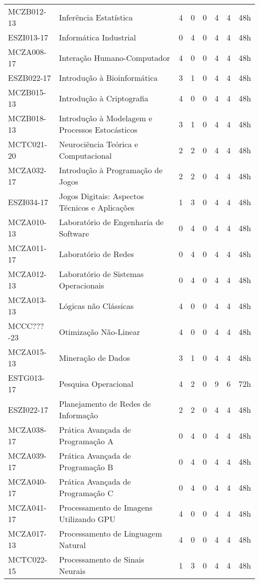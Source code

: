 \documentclass[a4paper]{article}
\begin{document}
\begin{longtable}{|l|l|llll|l|l|}
MCZB012-13 & Inferência Estatística & 4 & 0 & 0 & 4 & 4 & 48h \\
ESZI013-17 & Informática Industrial & 0 & 4 & 0 & 4 & 4 & 48h \\
MCZA008-17 & Interação Humano-Computador & 4 & 0 & 0 & 4 & 4 & 48h \\
ESZB022-17 & Introdução à Bioinformática & 3 & 1 & 0 & 4 & 4 & 48h \\
MCZB015-13 & Introdução à Criptografia & 4 & 0 & 0 & 4 & 4 & 48h \\
MCZB018-13 & Introdução à Modelagem e Processos Estocásticos & 3 & 1 & 0 & 4 & 4 & 48h \\
MCTC021-20 & Neurociência Teórica e Computacional & 2 & 2 & 0 & 4 & 4 & 48h \\
MCZA032-17 & Introdução à Programação de Jogos & 2 & 2 & 0 & 4 & 4 & 48h \\
ESZI034-17 & Jogos Digitais: Aspectos Técnicos e Aplicações & 1 & 3 & 0 & 4 & 4 & 48h \\
MCZA010-13 & Laboratório de Engenharia de Software & 0 & 4 & 0 & 4 & 4 & 48h \\
MCZA011-17 & Laboratório de Redes & 0 & 4 & 0 & 4 & 4 & 48h \\
MCZA012-13 & Laboratório de Sistemas Operacionais & 0 & 4 & 0 & 4 & 4 & 48h \\
MCZA013-13 & Lógicas não Clássicas & 4 & 0 & 0 & 4 & 4 & 48h \\
MCCC???-23 & Otimização Não-Linear & 4 & 0 & 0 & 4 & 4 & 48h \\
MCZA015-13 & Mineração de Dados & 3 & 1 & 0 & 4 & 4 & 48h \\
ESTG013-17 & Pesquisa Operacional & 4 & 2 & 0 & 9 & 6 & 72h \\
ESZI022-17 & Planejamento de Redes de Informação & 2 & 2 & 0 & 4 & 4 & 48h \\
MCZA038-17 & Prática Avançada de Programação A & 0 & 4 & 0 & 4 & 4 & 48h \\
MCZA039-17 & Prática Avançada de Programação B & 0 & 4 & 0 & 4 & 4 & 48h \\
MCZA040-17 & Prática Avançada de Programação C & 0 & 4 & 0 & 4 & 4 & 48h \\
MCZA041-17 & Processamento de Imagens Utilizando GPU & 4 & 0 & 0 & 4 & 4 & 48h \\
MCZA017-13 & Processamento de Linguagem Natural & 4 & 0 & 0 & 4 & 4 & 48h \\
MCTC022-15 & Processamento de Sinais Neurais & 1 & 3 & 0 & 4 & 4 & 48h \\

\end{longtable}
\end{document}
